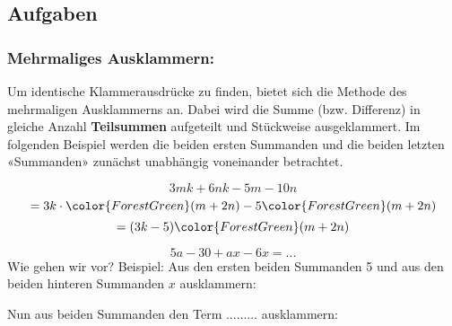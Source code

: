 
\subsection*{Aufgaben}





\newpage



\subsubsection{Mehrmaliges Ausklammern:}
 Um identische Klammerausdrücke zu finden, bietet sich die Methode des mehrmaligen Ausklammerns an.
 Dabei wird die Summe (bzw. Differenz) in gleiche Anzahl \textbf{Teilsummen} aufgeteilt und Stückweise ausgeklammert.
 Im folgenden Beispiel werden die beiden ersten Summanden und die beiden letzten «Summanden» zunächst unabhängig voneinander betrachtet.

$$3mk+6nk-5m-10n $$
$$= 3k\cdot{}{\color{ForestGreen}(m+2n)}-5{\color{ForestGreen}(m+2n)} $$
$$= (3k-5){\color{ForestGreen}(m+2n)}$$


\begin{beispiel}{}{}
  $$5a-30+ax-6x = ...$$
  Wie gehen wir vor? Beispiel: Aus den ersten beiden Summanden 5 und
  aus den beiden hinteren Summanden $x$ ausklammern:


  Nun aus beiden Summanden den Term ......... 
  ausklammern:

\end{beispiel}


